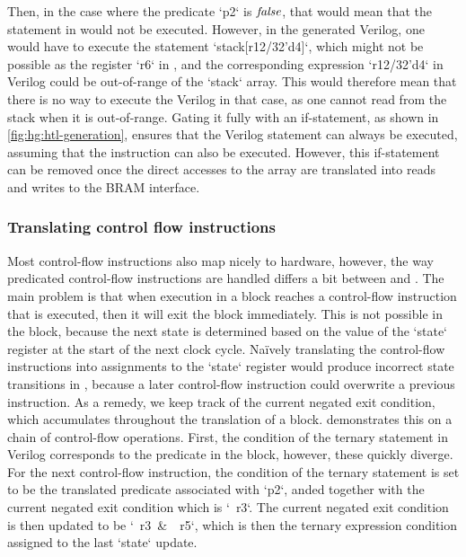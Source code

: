 \noindent Then, in the case where the predicate \rtlinline`p2` is $\mathit{false}$,
that would mean that the statement in \rtlsubpar{} would not be executed.
However, in the generated Verilog, one would have to execute the statement
\veriloginline`stack[r12/32'd4]`, which might not be possible as the register
\rtlinline`r6` in \rtlsubpar{}, and the corresponding expression
\veriloginline`r12/32'd4` in Verilog could be out-of-range of the
\veriloginline`stack` array.  This would therefore mean that there is no way to
execute the Verilog in that case, as one cannot read from the stack when it is
out-of-range.  Gating it fully with an if-statement, as shown in
\cref{fig:hg:htl-generation}, ensures that the Verilog statement can always be
executed, assuming that the \rtlsubpar{} instruction can also be executed.
However, this if-statement can be removed once the direct accesses to the array
are translated into reads and writes to the \gls{BRAM} interface.

\subsubsection{Translating control flow instructions}%
\label{sec:hg:translating-control-flow-instructions}

Most control-flow instructions also map nicely to hardware, however, the way
predicated control-flow instructions are handled differs a bit between
\rtlsubpar{} and \htl{}.  The main problem is that when execution in a
\rtlsubpar{} block reaches a control-flow instruction that is executed, then it
will exit the block immediately.  This is not possible in the \htl{} block,
because the next state is determined based on the value of the
\veriloginline`state` register at the start of the next clock cycle.  Na\"ively
translating the control-flow instructions into assignments to the
\veriloginline`state` register would produce incorrect state transitions in
\htl{}, because a later control-flow instruction could overwrite a previous
instruction.  As a remedy, we keep track of the current negated exit condition,
which accumulates throughout the translation of a block.
 demonstrates this on a chain of control-flow
operations.  First, the condition of the ternary statement in Verilog
corresponds to the predicate in the block, however, these quickly diverge.  For
the next control-flow instruction, the condition of the ternary statement is set
to be the translated predicate associated with \rtlinline`p2`, anded together
with the current negated exit condition which is \veriloginline`~r3`.  The
current negated exit condition is then updated to be \veriloginline`~r3 & ~r5`,
which is then the ternary expression condition assigned to the last
\veriloginline`state` update.

